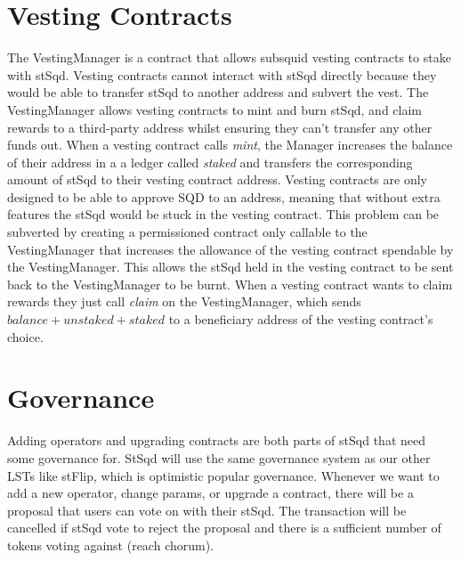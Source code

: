 \documentclass{article}
\begin{document}
\section{Vesting Contracts}
The VestingManager is a contract that allows subsquid vesting contracts to stake with stSqd. Vesting contracts cannot interact with stSqd directly because they would be able to transfer stSqd to another address and subvert the vest. The VestingManager allows vesting contracts to mint and burn stSqd, and claim rewards to a third-party address whilst ensuring they can't transfer any other funds out. When a vesting contract calls \textit{mint}, the Manager increases the balance of their address in a a ledger called \textit{staked} and transfers the corresponding amount of stSqd to their vesting contract address. Vesting contracts are only designed to be able to approve SQD to an address, meaning that without extra features the stSqd would be stuck in the vesting contract. This problem can be subverted by creating a permissioned contract only callable to the VestingManager that increases the allowance of the vesting contract spendable by the VestingManager. This allows the stSqd held in the vesting contract to be sent back to the VestingManager to be burnt. When a vesting contract wants to claim rewards they just call \textit{claim} on the VestingManager, which sends $balance + unstaked + staked$ to a beneficiary address of the vesting contract's choice.
\section{Governance}
Adding operators and upgrading contracts are both parts of stSqd that need some governance for. StSqd will use the same governance system as our other LSTs like stFlip, which is optimistic popular governance. Whenever we want to add a new operator, change params, or upgrade a contract, there will be a proposal that users can vote on with their stSqd. The transaction will be cancelled if stSqd vote to reject the proposal and there is a sufficient number of tokens voting against (reach chorum).
\end{document}
